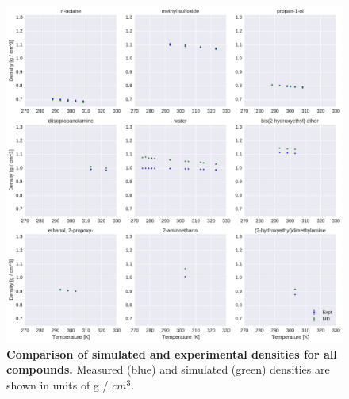 \documentclass[aip, jcp, reprint]{revtex4-1}  %
\begin{document}
\begin{figure}[alldensity]


\ContinuedFloat

\includegraphics[width=\textwidth]{./figures/densities_versus_temperature_part1.pdf}

\caption{{\bf Comparison of simulated and experimental densities for all compounds.} 
Measured (blue) and simulated (green) densities are shown in units of g / $cm^{3}$.
\label{figure:AllDensities}
}

\end{figure}
\end{document}
